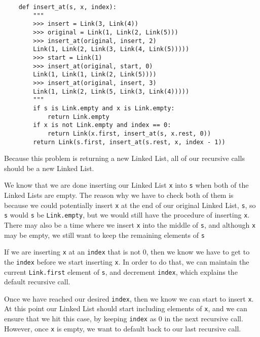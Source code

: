 \begin{solution}[0.6in]
\begin{lstlisting}
    def insert_at(s, x, index):
        """
        >>> insert = Link(3, Link(4))
        >>> original = Link(1, Link(2, Link(5)))
        >>> insert_at(original, insert, 2)
        Link(1, Link(2, Link(3, Link(4, Link(5)))))
        >>> start = Link(1)
        >>> insert_at(original, start, 0)
        Link(1, Link(1, Link(2, Link(5))))
        >>> insert_at(original, insert, 3)
        Link(1, Link(2, Link(5, Link(3, Link(4)))))
        """
        if s is Link.empty and x is Link.empty:
            return Link.empty
        if x is not Link.empty and index == 0:
            return Link(x.first, insert_at(s, x.rest, 0))
        return Link(s.first, insert_at(s.rest, x, index - 1))
\end{lstlisting}
    Because this problem is returning a new Linked List, all of our recursive calls should be a new Linked List. 

    We know that we are done inserting our Linked List \lstinline{x} into \lstinline{s} when both of the Linked Lists are empty. The reason why we have to check both of them is because we could potentially insert \lstinline{x} at the end of our original Linked List, \lstinline{s}, so \lstinline{s} would \lstinline{s} be \lstinline{Link.empty}, but we would still have the procedure of inserting \lstinline{x}. There may also be a time where we insert \lstinline{x} into the middle of \lstinline{s}, and although \lstinline{x} may be empty, we still want to keep the remaining elements of \lstinline{s}

    If we are inserting \lstinline{x} at an \lstinline{index} that is not 0, then we know we have to get to the \lstinline{index} before we start inserting \lstinline{x}. In order to do that, we can maintain the current \lstinline{Link.first} element of \lstinline{s}, and decrement \lstinline{index}, which explains the default recursive call.

    Once we have reached our desired \lstinline{index}, then we know we can start to insert \lstinline{x}. At this point our Linked List should start including elements of \lstinline{x}, and we can ensure that we hit this case, by keeping \lstinline{index} as 0 in the next recursive call. However, once \lstinline{x} is empty, we want to default back to our last recursive call.
    
\end{solution}

